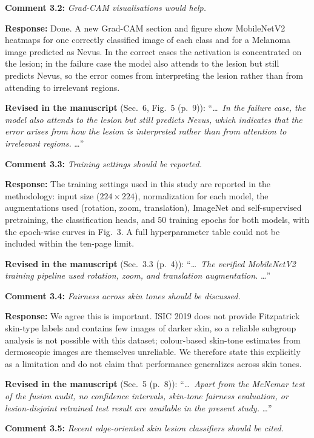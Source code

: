 \documentclass[11pt,a4paper]{article}
\begin{document}
\medskip
\textbf{Comment 3.2:} \emph{Grad-CAM visualisations would help.}

\textbf{Response:} Done. A new Grad-CAM section and figure show MobileNetV2 heatmaps for one correctly classified image of each class and for a Melanoma image predicted as Nevus. In the correct cases the activation is concentrated on the lesion; in the failure case the model also attends to the lesion but still predicts Nevus, so the error comes from interpreting the lesion rather than from attending to irrelevant regions.

\textbf{Revised in the manuscript} (Sec.~6, Fig.~5 (p.~9)): ``\ldots\ \emph{In the failure case, the model also attends to the lesion but still predicts Nevus, which indicates that the error arises from how the lesion is interpreted rather than from attention to irrelevant regions.} \ldots''

\medskip
\textbf{Comment 3.3:} \emph{Training settings should be reported.}

\textbf{Response:} The training settings used in this study are reported in the methodology: input size ($224\times224$), normalization for each model, the augmentations used (rotation, zoom, translation), ImageNet and self-supervised pretraining, the classification heads, and 50 training epochs for both models, with the epoch-wise curves in Fig.~3. A full hyperparameter table could not be included within the ten-page limit.

\textbf{Revised in the manuscript} (Sec.~3.3 (p.~4)): ``\ldots\ \emph{The verified MobileNetV2 training pipeline used rotation, zoom, and translation augmentation.} \ldots''

\medskip
\textbf{Comment 3.4:} \emph{Fairness across skin tones should be discussed.}

\textbf{Response:} We agree this is important. ISIC 2019 does not provide Fitzpatrick skin-type labels and contains few images of darker skin, so a reliable subgroup analysis is not possible with this dataset; colour-based skin-tone estimates from dermoscopic images are themselves unreliable. We therefore state this explicitly as a limitation and do not claim that performance generalizes across skin tones.

\textbf{Revised in the manuscript} (Sec.~5 (p.~8)): ``\ldots\ \emph{Apart from the McNemar test of the fusion audit, no confidence intervals, skin-tone fairness evaluation, or lesion-disjoint retrained test result are available in the present study.} \ldots''

\medskip
\textbf{Comment 3.5:} \emph{Recent edge-oriented skin lesion classifiers should be cited.}
\end{document}
